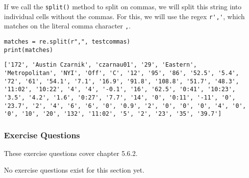 If we call the \verb|split()| method to split on commas, we will split this string into individual cells without the commas. For this, we will use the regex \verb|r','|, which matches on the literal comma character \verb|,|.\par
\begin{lstlisting}[style=pippython]
matches = re.split(r",", testcommas)
print(matches)
\end{lstlisting}
\begin{lstlisting}[style=none]
['172', 'Austin Czarnik', 'czarnau01', '29', 'Eastern', 'Metropolitan', 'NYI', 'Off', 'C', '12', '95', '86', '52.5', '5.4', '72', '61', '54.1', '7.1', '16.9', '91.8', '108.8', '51.7', '48.3', '11:02', '10:22', '4', '4', '-0.1', '16', '62.5', '0:41', '10:23', '3.5', '4.2', '1.6', '0:27', '7.7', '14', '0', '0:11', '-11', '0', '23.7', '2', '4', '6', '6', '0', '0.9', '2', '0', '0', '0', '4', '0', '0', '10', '20', '132', '11:02', '5', '2', '23', '35', '39.7']
\end{lstlisting}
\subsubsection*{Exercise Questions}
These exercise questions cover chapter 5.6.2.

No exercise questions exist for this section yet.


